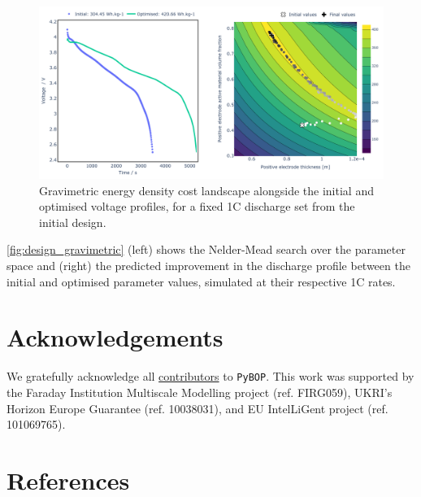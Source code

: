 \documentclass[
]{article}
\begin{document}
\begin{figure}
\centering
\includegraphics[width=1\textwidth,height=\textheight]{figures/joss/design.pdf}
\caption{Gravimetric energy density cost landscape alongside the initial
and optimised voltage profiles, for a fixed 1C discharge set from the
initial design. \label{fig:design_gravimetric}}
\end{figure}

\autoref{fig:design_gravimetric} (left) shows the Nelder-Mead search
over the parameter space and (right) the predicted improvement in the
discharge profile between the initial and optimised parameter values,
simulated at their respective 1C rates.

\section{Acknowledgements}\label{acknowledgements}

We gratefully acknowledge all
\href{https://github.com/pybop-team/PyBOP?tab=readme-ov-file\#contributors-}{contributors}
to \texttt{PyBOP}. This work was supported by the Faraday Institution
Multiscale Modelling project (ref. FIRG059), UKRI's Horizon Europe
Guarantee (ref. 10038031), and EU IntelLiGent project (ref. 101069765).

\section*{References}\label{references}
\end{document}
